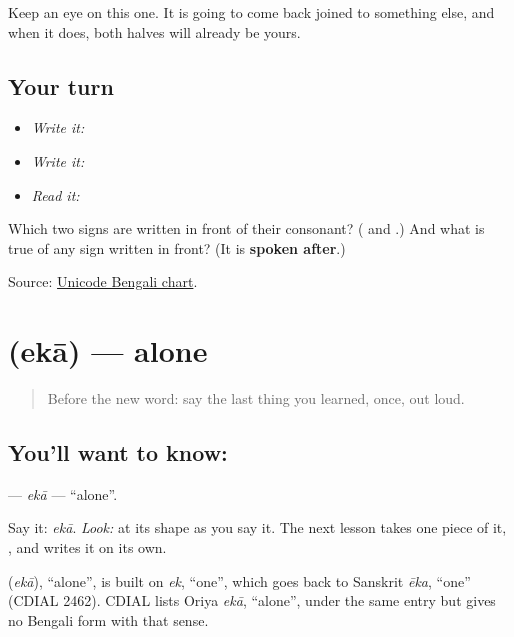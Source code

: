Keep an eye on this one. It is going to come back joined to something else, and when it does, both halves will already be yours.

\subsection*{Your turn}
\begin{itemize}
\raggedright
  \item \emph{Write it:} 
  \item \emph{Write it:} 
  \item \emph{Read it:} 
\end{itemize}

\begin{tcolorbox}[breakable,colback=teal!4,colframe=teal!35!black,title={Before you move on}]
Which two signs are written in front of their consonant? (\textbf{} and \textbf{}.) And what is true of any sign written in front? (It is \textbf{spoken after}.)

Source: \href{https://www.unicode.org/charts/PDF/U0980.pdf}{Unicode Bengali chart}.
\end{tcolorbox}
\section[\texorpdfstring{\bn{একা} (ekā)}{একা (ekā)}]{ (ekā) — alone}

\label{lesson:BN-C06-eka}



\begin{quote}
Before the new word: say the last thing you learned, once, out loud.
\end{quote}

\subsection*{You'll want to know: }
\textbf{} — \emph{ekā} — \textquotedblleft{}alone\textquotedblright{}.

Say it: \emph{ekā}. \emph{Look:} at its shape as you say it. The next lesson takes one piece of it, \textbf{}, and writes it on its own.

\begin{cousinweb}
\textbf{} (\emph{ekā}), \textquotedblleft{}alone\textquotedblright{}, is built on \emph{ek}, \textquotedblleft{}one\textquotedblright{}, which goes back to Sanskrit \emph{ēka}, \textquotedblleft{}one\textquotedblright{} (CDIAL 2462). CDIAL lists Oriya \emph{ekā}, \textquotedblleft{}alone\textquotedblright{}, under the same entry but gives no Bengali form with that sense.
\end{cousinweb}


